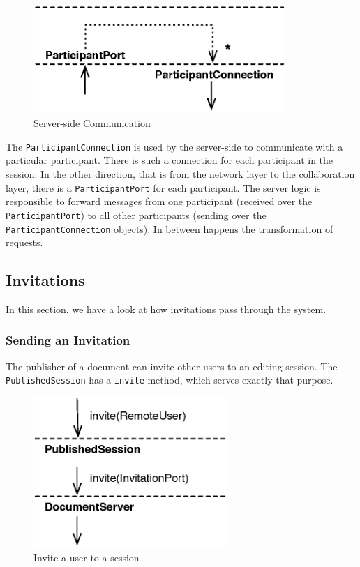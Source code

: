 \begin{figure}[H]
 \centering
 \includegraphics[width=9.56cm,height=4.09cm]{../images/finalreport/architecture_flows/portconnection.eps}
 \caption{Server-side Communication}
 \label{fig:archoverview.flow.portconnection}
\end{figure}

The \texttt{ParticipantConnection} is used by the server-side to communicate
with a particular participant. There is such a connection for each
participant in the session. In the other direction, that is from the
network layer to the collaboration layer, there is a 
\texttt{ParticipantPort} for each participant. The server logic is
responsible to forward messages from one participant (received over the
\texttt{ParticipantPort}) to all other participants (sending over the
\texttt{ParticipantConnection} objects). In between happens the transformation
of requests.


\subsection{Invitations}
In this section, we have a look at how invitations pass through the system.

\subsubsection{Sending an Invitation}
The publisher of a document can invite other users to an editing session.
The \texttt{PublishedSession} has a \texttt{invite} method, which serves
exactly that purpose.

\begin{figure}[H]
 \centering
 \includegraphics[width=7.34cm,height=5.72cm]{../images/finalreport/architecture_flows/invite_initiate.eps}
 \caption{Invite a user to a session}
 \label{fig:archoverview.flow.inviteinitiate}
\end{figure}

